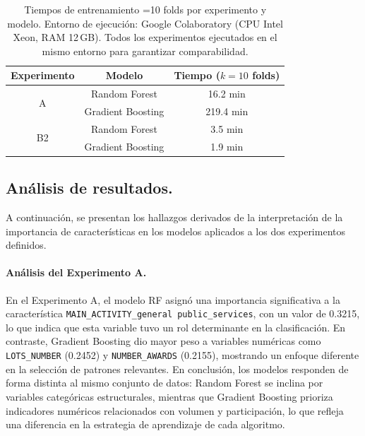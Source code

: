 \documentclass[a4paper,fleqn]{cas-sc}
\begin{document}
\begin{table}[tb]	
	\caption{Tiempos de entrenamiento =10 folds por experimento y modelo. Entorno de ejecución: Google Colaboratory (CPU Intel Xeon, RAM 12\,GB). Todos los experimentos ejecutados en el mismo entorno para garantizar comparabilidad.}
	\label{tab:tiempo_respuesta_ml}
	\centering
	\small
	\setlength{\tabcolsep}{7pt}
	\renewcommand{\arraystretch}{1.3} %
	\begin{tabular}{ccc}\hline
\textbf{Experimento} & \textbf{Modelo} & \textbf{Tiempo ($k=10$ folds)} \\ \hline
\multirow{2}{*}{A} & Random Forest & 16.2 min \\ \cline{2-3}
& Gradient Boosting & 219.4 min \\ \hline
\multirow{2}{*}{B2} & Random Forest & 3.5 min \\ \cline{2-3}
& Gradient Boosting & 1.9 min \\ \hline
\end{tabular}
\end{table}


\subsection*{Análisis de resultados.}

A continuación, se presentan los hallazgos derivados de la interpretación de la importancia de características en los modelos aplicados a los dos experimentos definidos.

\paragraph{\textbf{Análisis del Experimento A.}}

%
En el Experimento A, el modelo RF asign\'o una importancia significativa a la caracter\'istica \texttt{MAIN\_ACTIVITY\_general public\_services}, con un valor de 0.3215, lo que indica que esta variable tuvo un rol determinante en la clasificaci\'on. En contraste, {Gradient Boosting} dio mayor peso a variables num\'ericas como \texttt{LOTS\_NUMBER} (0.2452) y \texttt{NUMBER\_AWARDS} (0.2155), mostrando un enfoque diferente en la selecci\'on de patrones relevantes.
%
{En conclusi\'on}, los modelos responden de forma distinta al mismo conjunto de datos: Random Forest se inclina por variables categóricas estructurales, mientras que Gradient Boosting prioriza indicadores numéricos relacionados con volumen y participación, lo que refleja una diferencia en la estrategia de aprendizaje de cada algoritmo.
\end{document}
